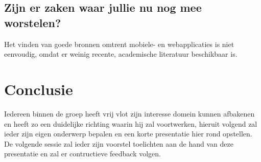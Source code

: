\documentclass[fleqn,10pt]{voorstel}
\begin{document}
\subsection{Zijn er zaken waar jullie nu nog mee worstelen?}
Het vinden van goede bronnen omtrent mobiele- en webapplicaties is niet eenvoudig, omdat er weinig recente, academische literatuur beschikbaar is. 


\section{Conclusie}
Iedereen binnen de groep heeft vrij vlot zijn interesse domein kunnen afbakenen en heeft zo een duidelijke richting waarin hij zal voortwerken, hieruit volgend zal ieder zijn eigen onderwerp bepalen en een korte presentatie hier rond opstellen. De volgende sessie zal ieder zijn voorstel toelichten aan de hand van deze presentatie en zal er contructieve feedback volgen.




\end{document}
